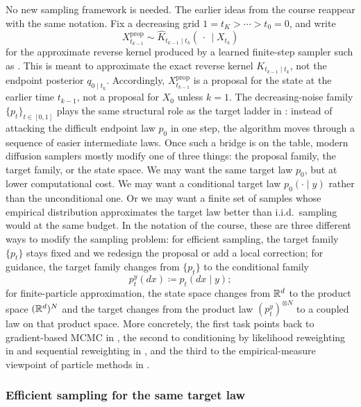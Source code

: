 No new sampling framework is needed.
The earlier ideas from the course reappear with the same notation.
Fix a decreasing grid \(1=t_K>\cdots>t_0=0\), and write
\[
  X_{t_{k-1}}^{\mathrm{prop}}
  \sim
  \hat K_{t_{k-1}\mid t_k}(\,\cdot\,\mid X_{t_k})
\]
for the approximate reverse kernel produced by a learned finite-step sampler such as .
This is meant to approximate the exact reverse kernel \(K_{t_{k-1}\mid t_k}\), not the endpoint posterior \(q_{0\mid t_k}\).
Accordingly, \(X_{t_{k-1}}^{\mathrm{prop}}\) is a proposal for the state at the earlier time \(t_{k-1}\), not a proposal for \(X_0\) unless \(k=1\).
The decreasing-noise family \(\{p_t\}_{t\in[0,1]}\) plays the same structural role as the target ladder in :
instead of attacking the difficult endpoint law \(p_0\) in one step, the algorithm moves through a sequence of easier intermediate laws.
Once such a bridge is on the table, modern diffusion samplers mostly modify one of three things: the proposal family, the target family, or the state space.
We may want the same target law \(p_0\), but at lower computational cost.
We may want a conditional target law \(p_0(\cdot\mid y)\) rather than the unconditional one.
Or we may want a finite set of samples whose empirical distribution approximates the target law better than i.i.d.\ sampling would at the same budget.
In the notation of the course, these are three different ways to modify the sampling problem:
for efficient sampling, the target family \(\{p_t\}\) stays fixed and we redesign the proposal or add a local correction;
for guidance, the target family changes from \(\{p_t\}\) to the conditional family
\[
  p_t^y(dx)\coloneqq p_t(dx\mid y);
\]
for finite-particle approximation, the state space changes from \(\mathbb{R}^d\) to the product space \((\mathbb{R}^d)^N\) and the target changes from the product law \((p_t^y)^{\otimes N}\) to a coupled law on that product space.
More concretely, the first task points back to gradient-based MCMC in , the second to conditioning by likelihood reweighting in  and sequential reweighting in , and the third to the empirical-measure viewpoint of particle methods in .

\subsubsection{Efficient sampling for the same target law}
\label{subsubsec:diffusion-efficient-sampling}


